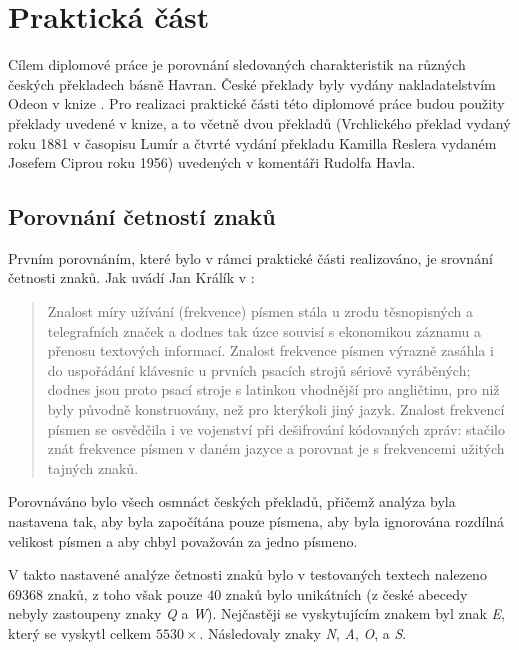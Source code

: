 \documentclass[dp.tex]{subfiles}
\begin{document}
\chapter{Praktická část}
\label{chap:experiment} 

Cílem diplomové práce je porovnání sledovaných charakteristik na různých českých překladech básně Havran. České překlady byly vydány nakladatelstvím Odeon v knize . Pro realizaci praktické části této diplomové práce budou použity překlady uvedené v knize, a to včetně dvou překladů (Vrchlického překlad vydaný roku 1881 v časopisu Lumír a čtvrté vydání překladu Kamilla Reslera vydaném Josefem Ciprou roku 1956) uvedených v komentáři Rudolfa Havla.

\section{Porovnání četností znaků}

Prvním porovnáním, které bylo v rámci praktické části realizováno, je srovnání četnosti znaků. Jak uvádí Jan Králík v \cite[str.~109]{Tesitelova1987}: 

\begin{quote}
Znalost míry užívání (frekvence) písmen stála u zrodu těsnopisných a telegrafních značek a dodnes tak úzce souvisí s ekonomikou záznamu a přenosu textových informací. Znalost frekvence písmen výrazně zasáhla i do uspořádání klávesnic u prvních psacích strojů sériově vyráběných; dodnes jsou proto psací stroje s latinkou vhodnější pro angličtinu, pro niž byly původně konstruovány, než pro kterýkoli jiný jazyk. Znalost frekvencí písmen se osvědčila i ve vojenství při dešifrování kódovaných zpráv: stačilo znát frekvence písmen v daném jazyce a porovnat je s frekvencemi užitých \clq tajných znaků\crq.
\end{quote}

Porovnáváno bylo všech osmnáct českých překladů, přičemž analýza byla nastavena tak, aby byla započítána pouze písmena, aby byla ignorována rozdílná velikost písmen a aby  \clq ch\crq byl považován za jedno písmeno.

V takto nastavené analýze četnosti znaků bylo v testovaných textech nalezeno $69 368$ znaků, z toho však pouze $40$ znaků bylo unikátních (z české abecedy nebyly zastoupeny znaky \textit{Q} a \textit{W}). Nejčastěji se vyskytujícím znakem byl znak \textit{E}, který se vyskytl celkem $5530\times$. Následovaly znaky \textit{N}, \textit{A}, \textit{O}, a \textit{S}.
\end{document}
